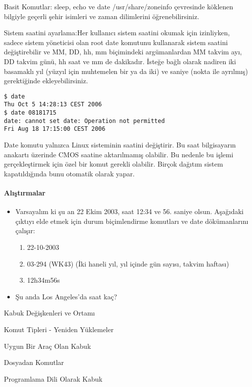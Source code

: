 \begin{section}{Basit Komutlar: sleep, echo ve date}
/usr/share/zoneinfo çevresinde köklenen bilgiyle geçerli şehir isimleri ve zaman dilimlerini öğrenebilirsiniz.

Sistem saatini ayarlama:Her kullanıcı sistem saatini okumak için izinliyken, sadece sistem yöneticisi olan root date komutunu kullanarak sistem saatini değiştirebilir ve MM, DD, hh, mm biçimindeki argümanlardan MM takvim ayı, DD takvim günü, hh saat ve mm de dakikadır. İsteğe bağlı olarak nadiren iki basamaklı yıl (yüzyıl için muhtemelen bir ya da iki) ve saniye (nokta ile ayrılmış) gerektiğinde ekleyebilirsiniz.
\begin{verbatim}
$ date
Thu Oct 5 14:28:13 CEST 2006
$ date 08181715
date: cannot set date: Operation not permitted
Fri Aug 18 17:15:00 CEST 2006
\end{verbatim}

Date komutu yalnızca Linux sisteminin saatini değiştirir. Bu saat bilgisayarın anakartı üzerinde CMOS saatine aktarılmamış olabilir. Bu nedenle bu işlemi
gerçekleştirmek için özel bir komut gerekli olabilir. Birçok dağıtım sistem kapatıldığında bunu otomatik olarak yapar.

\paragraph{Alıştırmalar}{
\begin{itemize}
\item Varsayalım ki şu an 22 Ekim 2003, saat 12:34 ve 56. saniye olsun. Aşağıdaki çıktıyı elde etmek için durum biçimlendirme komutları ve date dökümanlarını
çalışır:
\begin{enumerate}
\item 22-10-2003
\item 03-294 (WK43)  (İki haneli yıl, yıl içinde gün sayısı, takvim haftası)
\item 12h34m56s
\end{enumerate}
\item Şu anda Los Angeles’da saat kaç?
\end{itemize}
}










\end{section}
\begin{section}{Kabuk Değişkenleri ve Ortamı}

\end{section}
\begin{section}{Komut Tipleri - Yeniden Yüklemeler}

\end{section}
\begin{section}{Uygun Bir Araç Olan Kabuk}

\end{section}
\begin{section}{Dosyadan Komutlar}

\end{section}
\begin{section}{Programlama Dili Olarak Kabuk}

\end{section}